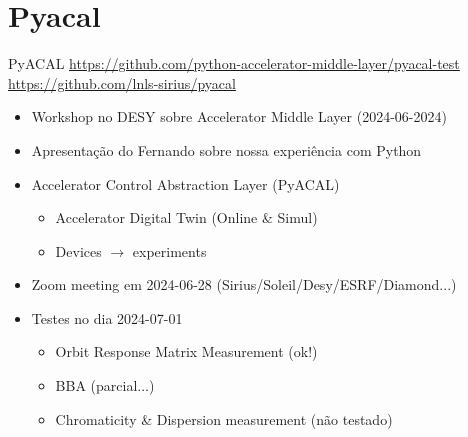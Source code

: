 \section{Pyacal}






\begin{frame}{PyACAL}
{\footnotesize
\url{https://github.com/python-accelerator-middle-layer/pyacal-test}
\url{https://github.com/lnls-sirius/pyacal}
}
    \begin{itemize}
        \setlength\itemsep{1em}
        \item Workshop no DESY sobre Accelerator Middle Layer (2024-06-2024) \href{https://indico.desy.de/event/43233/}{}
        \item Apresentação do Fernando sobre nossa experiência com Python 
        \href{https://indico.desy.de/event/43233/contributions/169377/attachments/90992/122797/SIRIUS_python_code.pdf}{}
        
        \item Accelerator Control Abstraction Layer (PyACAL)
            \begin{itemize}
                \item Accelerator Digital Twin (Online \& Simul)
                \item Devices $\rightarrow$ experiments
            \end{itemize}
        \item Zoom meeting em 2024-06-28 (Sirius/Soleil/Desy/ESRF/Diamond...)
        \item Testes no dia 2024-07-01
            \begin{itemize}
                \item Orbit Response Matrix Measurement (ok!)
                \item BBA (parcial...)
                \item Chromaticity \& Dispersion measurement (não testado)
            \end{itemize}
    \end{itemize}
\end{frame}
